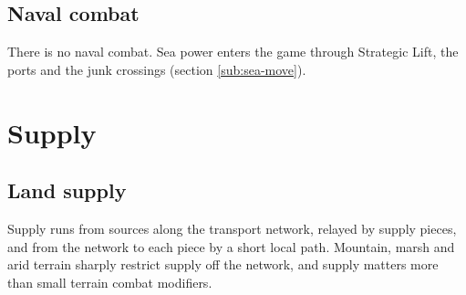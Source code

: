 \documentclass[11pt]{article}
\begin{document}
\subsection{Naval combat}
There is no naval combat. Sea power enters the game through Strategic Lift, the ports and the junk crossings (section \ref{sub:sea-move}).

\section{Supply}\label{sec:supply}
\subsection{Land supply}\label{sub:supply}
Supply runs from sources along the transport network, relayed by supply pieces, and from the network to each piece by a short local path. Mountain, marsh and arid terrain sharply restrict supply off the network, and supply matters more than small terrain combat modifiers.
\end{document}
